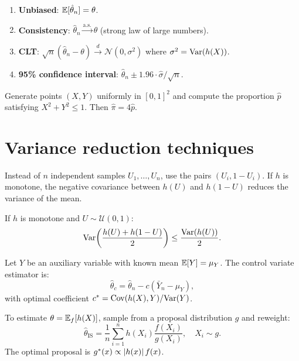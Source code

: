 \begin{theorem}
\begin{enumerate}
  \item \textbf{Unbiased}: $\mathbb{E}[\hat{\theta}_n] = \theta$.
  \item \textbf{Consistency}: $\hat{\theta}_n \xrightarrow{\text{a.s.}} \theta$
        (strong law of large numbers).
  \item \textbf{CLT}: $\sqrt{n}(\hat{\theta}_n - \theta)
        \xrightarrow{d} \mathcal{N}(0, \sigma^2)$ where
        $\sigma^2 = \mathrm{Var}(h(X))$.
  \item \textbf{95\% confidence interval}:
        $\hat{\theta}_n \pm 1.96 \cdot \hat{\sigma}/\sqrt{n}$.
\end{enumerate}
\end{theorem}

\begin{example}[Estimating $\pi$]
Generate points $(X, Y)$ uniformly in $[0,1]^2$ and compute the proportion
$\hat{p}$ satisfying $X^2 + Y^2 \leq 1$. Then $\hat{\pi} = 4\hat{p}$.
\end{example}

\section{Variance reduction techniques}

\begin{definition}
Instead of $n$ independent samples $U_1, \ldots, U_n$, use the pairs
$(U_i, 1 - U_i)$. If $h$ is monotone, the negative covariance between
$h(U)$ and $h(1-U)$ reduces the variance of the mean.
\end{definition}

\begin{proposition}
If $h$ is monotone and $U \sim \mathcal{U}(0,1)$:
\[
  \mathrm{Var}\!\left(\frac{h(U) + h(1-U)}{2}\right)
  \leq \frac{\mathrm{Var}(h(U))}{2}.
\]
\end{proposition}

\begin{definition}
Let $Y$ be an auxiliary variable with known mean $\mathbb{E}[Y] = \mu_Y$. The
control variate estimator is:
\[
  \hat{\theta}_c = \hat{\theta}_n - c(\bar{Y}_n - \mu_Y),
\]
with optimal coefficient $c^* = \mathrm{Cov}(h(X), Y) / \mathrm{Var}(Y)$.
\end{definition}

\begin{definition}
To estimate $\theta = \mathbb{E}_f[h(X)]$, sample from a proposal distribution $g$
and reweight:
\[
  \hat{\theta}_{\mathrm{IS}} = \frac{1}{n} \sum_{i=1}^n h(X_i)
  \frac{f(X_i)}{g(X_i)}, \quad X_i \sim g.
\]
The optimal proposal is $g^*(x) \propto \left| h(x) \right| f(x)$.
\end{definition}

